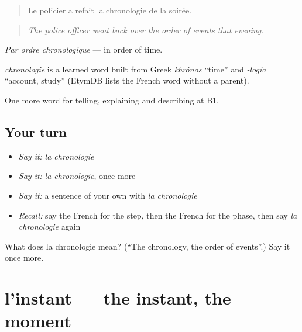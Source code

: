 \begin{quote}
Le policier a refait la chronologie de la soirée.
\end{quote}

\begin{quote}
\emph{The police officer went back over the order of events that evening.}
\end{quote}

\emph{Par ordre chronologique} — in order of time.

\begin{cousinweb}
\emph{chronologie} is a learned word built from Greek \emph{khrónos} \textquotedblleft{}time\textquotedblright{} and \emph{-logía} \textquotedblleft{}account, study\textquotedblright{} (EtymDB lists the French word without a parent).
\end{cousinweb}

\begin{grammarlens}[title={What you've built}]
One more word for telling, explaining and describing at B1.
\end{grammarlens}

\subsection*{Your turn}
\begin{itemize}
\raggedright
  \item \emph{Say it:} \emph{la chronologie}
  \item \emph{Say it:} \emph{la chronologie}, once more
  \item \emph{Say it:} a sentence of your own with \emph{la chronologie}
  \item \emph{Recall:} say the French for the step, then the French for the phase, then say \emph{la chronologie} again
\end{itemize}

\begin{tcolorbox}[breakable,colback=teal!4,colframe=teal!35!black,title={Before you move on}]
What does la chronologie mean? (\textquotedblleft{}The chronology, the order of events\textquotedblright{}.) Say it once more.
\end{tcolorbox}
\section[l'instant]{l'instant — the instant, the moment}

\label{lesson:FR-C277-instant}



